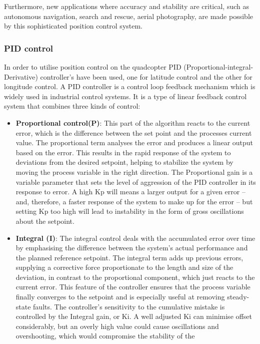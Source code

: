 \documentclass{article}
\begin{document}
Furthermore, new applications where accuracy and stability are critical, such as
autonomous navigation, search and rescue, aerial photography, are made possible
by this sophisticated position control system.

\subsubsection{PID control}\label{PID_control} In order to utilise position
control on the quadcopter PID (Proportional-integral-Derivative) controller's
have been used, one for latitude control and the other for longitude control. A
PID controller is a control loop feedback mechanism which is widely used in
industrial control systems. It is a type of linear feedback control system that
combines three kinds of control:
\begin{itemize}
  \item \textbf{Proportional control(P)}: This part of the algorithm reacts to
  the current error, which is the difference between the set point and the
  processes current value. The proportional term analyses the error and produces
  a linear output based on the error. This results in the rapid response of the
  system to deviations from the desired setpoint, helping to stabilize the
  system by moving the process variable in the right direction. The Proportional
  gain is a variable parameter that sets the level of aggression of the PID
  controller in its response to error. A high Kp will means a larger output for
  a given error – and, therefore, a faster response of the system to make up for
  the error – but setting Kp too high will lead to instability in the form of
  gross oscillations about the setpoint.
  \item \textbf{Integral (I)}: The integral control deals with the accumulated
  error over time by emphasising the difference between the system's actual
  performance and the planned reference setpoint. The integral term adds up
  previous errors, supplying a corrective force proportionate to the length and
  size of the deviation, in contrast to the proportional component, which just
  reacts to the current error. This feature of the controller ensures that the
  process variable finally converges to the setpoint and is especially useful at
  removing steady-state faults. The controller's sensitivity to the cumulative
  mistake is controlled by the Integral gain, or Ki. A well adjusted Ki can
  minimise offset considerably, but an overly high value could cause
  oscillations and overshooting, which would compromise the stability of the

\end{itemize}
\end{document}
